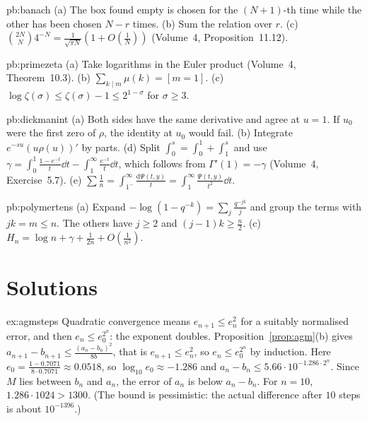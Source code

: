 \begin{hint}{pb:banach}
(a) The box found empty is chosen for the $(N+1)$-th time while the other has been chosen $N-r$ times. (b) Sum the relation over $r$. (c) $\binom{2N}N4^{-N}=\frac1{\sqrt{\pi N}}(1+O(\frac1N))$
(Volume~4, Proposition~11.12).
\end{hint}

\begin{hint}{pb:primezeta}
(a) Take logarithms in the Euler product (Volume~4, Theorem~10.3). (b) $\sum_{k\mid m}\mu(k)=[m=1]$. (c) $\log\zeta(\sigma)\le\zeta(\sigma)-1\le2^{1-\sigma}$ for $\sigma\ge3$.
\end{hint}

\begin{hint}{pb:dickmanint}
(a) Both sides have the same derivative and agree at $u=1$. If $u_0$ were the first zero of $\rho$, the identity at $u_0$ would fail. (b) Integrate $e^{-su}(u\rho(u))'$ by parts.
(d) Split $\int_0^s=\int_0^1+\int_1^s$ and use $\gamma=\int_0^1\frac{1-e^{-t}}t\dd t-\int_1^\infty\frac{e^{-t}}t\dd t$, which follows from $\Gamma'(1)=-\gamma$ (Volume~4, Exercise~5.7).
(e) $\sum\frac1n=\int_{1^-}^\infty\frac{\mathrm d\Psi(t,y)}t=\int_1^\infty\frac{\Psi(t,y)}{t^2}\dd t$.
\end{hint}

\begin{hint}{pb:polymertens}
(a) Expand $-\log(1-q^{-k})=\sum_j\frac{q^{-jk}}j$ and group the terms with $jk=m\le n$. The others have $j\ge2$ and $(j-1)k\ge\frac n2$. (c) $H_n=\log n+\gamma+\frac1{2n}+O(\frac1{n^2})$.
\end{hint}

\section{Solutions}

\begin{solution}{ex:agmsteps}
\idea Quadratic convergence means $e_{n+1}\le e_n^2$ for a suitably normalised error, and then $e_n\le e_0^{2^n}$: the exponent doubles.
\writeup Proposition~\ref{prop:agm}(b) gives $a_{n+1}-b_{n+1}\le\frac{(a_n-b_n)^2}{8b}$, that is $e_{n+1}\le e_n^2$, so $e_n\le e_0^{2^n}$ by induction. Here
$e_0=\frac{1-0.7071}{8\cdot0.7071}\approx0.0518$, so $\log_{10}e_0\approx-1.286$ and $a_n-b_n\le5.66\cdot10^{-1.286\cdot2^n}$. Since $M$ lies between $b_n$ and $a_n$, the error of $a_n$
is below $a_n-b_n$. For $n=10$, $1.286\cdot1024>1300$. (The bound is pessimistic: the actual difference after $10$ steps is about $10^{-1396}$.)
\end{solution}

